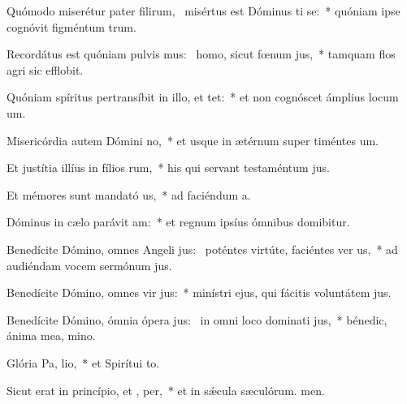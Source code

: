 \item Quómodo miserétur pater filirum,~\pscross{} misértus est Dóminus ti se:~* quóniam ipse cognóvit figméntum trum.
\item Recordátus est quóniam pulvis mus:~\pscross{} homo, sicut fœnum  jus,~* tamquam flos agri sic efflobit.
\item Quóniam spíritus pertransíbit in illo, et  tet:~* et non cognóscet ámplius locum um.
\item Misericórdia autem Dómini  no,~* et usque in ætérnum super timéntes um.
\item Et justítia illíus in fílios rum,~* his qui servant testaméntum jus.
\item Et mémores sunt mandató us,~* ad faciéndum a.
\item Dóminus in cælo parávit  am:~* et regnum ipsíus ómnibus domibitur.
\item Benedícite Dómino, omnes Angeli jus:~\pscross{} poténtes virtúte, faciéntes ver us,~* ad audiéndam vocem sermónum jus.
\item Benedícite Dómino, omnes vir jus:~* minístri ejus, qui fácitis voluntátem jus.
\item Benedícite Dómino, ómnia ópera jus:~\pscross{} in omni loco dominati jus,~* bénedic, ánima mea, mino.
\item Glória Pa,  lio,~* et Spirítui to.
\item Sicut erat in princípio, et ,  per,~* et in sǽcula sæculórum. men.
